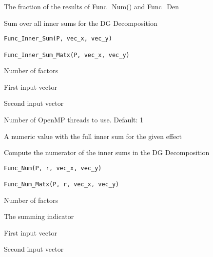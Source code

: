\documentclass[a4paper]{book}
\begin{document}
%
\begin{Value}
The fraction of the results of Func\_Num() and Func\_Den
\end{Value}
%
\begin{Description}\relax
Sum over all inner sums for the DG Decomposition
\end{Description}
%
\begin{Usage}
\begin{verbatim}
Func_Inner_Sum(P, vec_x, vec_y)

Func_Inner_Sum_Matx(P, vec_x, vec_y)
\end{verbatim}
\end{Usage}
%
\begin{Arguments}
\begin{ldescription}
\item[\code{P}] Number of factors

\item[\code{vec\_x}] First input vector

\item[\code{vec\_y}] Second input vector

\item[\code{threads}] Number of OpenMP threads to use. Default: 1
\end{ldescription}
\end{Arguments}
%
\begin{Value}
A numeric value with the full inner sum for the given effect
\end{Value}
%
\begin{Description}\relax
Compute the numerator of the inner sums in the DG Decomposition
\end{Description}
%
\begin{Usage}
\begin{verbatim}
Func_Num(P, r, vec_x, vec_y)

Func_Num_Matx(P, r, vec_x, vec_y)
\end{verbatim}
\end{Usage}
%
\begin{Arguments}
\begin{ldescription}
\item[\code{P}] Number of factors

\item[\code{r}] The summing indicator

\item[\code{vec\_x}] First input vector

\item[\code{vec\_y}] Second input vector
\end{ldescription}
\end{Arguments}
\end{document}
